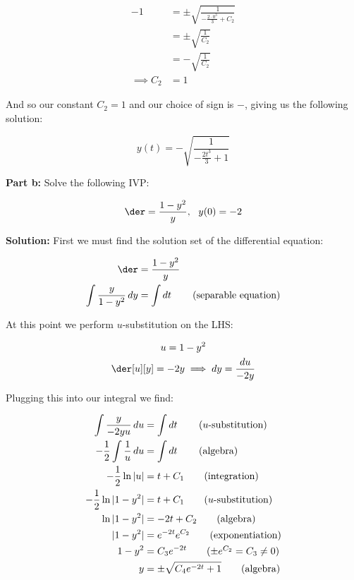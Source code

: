 \documentclass{article}
\begin{document}
\begin{align*}
    -1&=\pm\sqrt{\frac{1}{-\frac{2\cdot0^3}{3}+C_2}}\tag{$(t,y)=(0,-1)$}\\
    &=\pm\sqrt{\frac{1}{C_2}}\\
    &=-\sqrt{\frac{1}{C_2}}\tag{$+$ case impossible}\\
    \implies C_2&=1
\end{align*}

And so our constant $C_2=1$ and our choice of sign is $-$, giving us the following solution:

\begin{equation*}
    y(t)=-\sqrt{\frac{1}{-\frac{2t^3}{3}+1}}
\end{equation*}
\bigskip

\noindent\textbf{Part b:} Solve the following IVP:

\begin{equation*}
    \der=\frac{1-y^2}{y},\,\,\,\, y(0)=-2
\end{equation*}
\smallskip

\noindent\textbf{Solution:} First we must find the solution set of the differential equation:

\begin{align*}
    \der&=\frac{1-y^2}{y}\\
    \int\frac{y}{1-y^2}\mathop{dy}&=\int\mathop{dt}\tag{separable equation}\\
\end{align*}

At this point we perform $u$-substitution on the LHS:

\begin{gather*}
    u=1-y^2\\
    \der[u][y]=-2y\implies dy=\frac{du}{-2y}
\end{gather*}

Plugging this into our integral we find:

\begin{align*}
    \int\frac{y}{-2yu}\mathop{du}&=\int\mathop{dt}\tag{$u$-substitution}\\
    -\frac{1}{2}\int\frac{1}{u}\mathop{du}&=\int\mathop{dt}\tag{algebra}\\
    -\frac{1}{2}\ln|u|&=t+C_1\tag{integration}\\
    -\frac{1}{2}\ln|1-y^2|&=t+C_1\tag{$u$-substitution}\\
    \ln|1-y^2|&=-2t+C_2\tag{algebra}\\
    |1-y^2|&=e^{-2t}e^{C_2}\tag{exponentiation}\\
    1-y^2&=C_3e^{-2t}\tag{$\pm e^{C_2}=C_3\not=0$}\\
    y&=\pm\sqrt{C_4e^{-2t}+1}\tag{algebra}
\end{align*}
\end{document}
